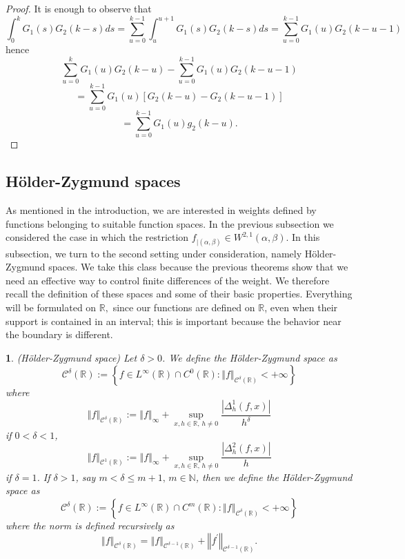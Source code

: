 \documentclass[10pt,a4paper]{amsart}
\numberwithin{equation}{section}
\numberwithin{figure}{section}
\newtheorem{defn}[thm]{\protect\definitionname}
\providecommand{\definitionname}{Definition}
\begin{document}
\begin{proof}
It is enough to observe that
\[
\int_{0}^{k}G_{1}(s)G_{2}(k-s)ds=\sum_{u=0}^{k-1}\int_{u}^{u+1}G_{1}(s)G_{2}(k-s)ds=\sum_{u=0}^{k-1}G_{1}(u)G_{2}(k-u-1)
\]
hence
\[
\sum_{u=0}^{k}G_{1}(u)G_{2}(k-u)-\sum_{u=0}^{k-1}G_{1}(u)G_{2}(k-u-1)
\]
\[
=\sum_{u=0}^{k-1}G_{1}(u)\left[G_{2}(k-u)-G_{2}(k-u-1)\right]
\]
\[
=\sum_{u=0}^{k-1}G_{1}(u)g_{2}\left(k-u\right).
\]
\end{proof}

\subsection{H\"older-Zygmund spaces}

As mentioned in the introduction, we are interested in weights defined
by functions belonging to suitable function spaces. In the previous
subsection we considered the case in which the restriction $f_{\vert\left(\alpha,\beta\right)}\in W^{2,1}\left(\alpha,\beta\right)$.
In this subsection, we turn to the second setting under consideration,
namely H\"older-Zygmund spaces. We take this class because the previous
theorems show that we need an effective way to control finite differences
of the weight. We therefore recall the definition of these spaces
and some of their basic properties. Everything will be formulated
on $\mathbb{R},$ since our functions are defined on $\mathbb{R}$,
even when their support is contained in an interval; this is important
because the behavior near the boundary is different.

\begin{defn}
(H\"older-Zygmund space) Let $\delta>0$. We define the H\"older-Zygmund
space as
\[
\mathcal{C}^{\delta}\left(\mathbb{R}\right):=\left\{ f\in L^{\infty}\left(\mathbb{R}\right)\cap C^{0}\left(\mathbb{R}\right):\left\Vert f\right\Vert _{\mathcal{C}^{\delta}\left(\mathbb{R}\right)}<+\infty\right\} 
\]
where
\[
\left\Vert f\right\Vert _{\mathcal{C}^{\delta}\left(\mathbb{R}\right)}:=\left\Vert f\right\Vert _{\infty}+\sup_{x,h\in\mathbb{R},\,h\neq0}\frac{\left|\Delta_{h}^{1}\left(f,x\right)\right|}{h^{\delta}}
\]
if $0<\delta<1$,
\[
\left\Vert f\right\Vert _{\mathcal{C}^{1}\left(\mathbb{R}\right)}:=\left\Vert f\right\Vert _{\infty}+\sup_{x,h\in\mathbb{R},\,h\neq0}\frac{\left|\Delta_{h}^{2}\left(f,x\right)\right|}{h}
\]
if $\delta=1$. If $\delta>1$, say $m<\delta\leq m+1,\,m\in\mathbb{N}$,
then we define the H\"older-Zygmund space as
\[
\mathcal{C}^{\delta}\left(\mathbb{R}\right):=\left\{ f\in L^{\infty}\left(\mathbb{R}\right)\cap C^{m}\left(\mathbb{R}\right):\left\Vert f\right\Vert _{\mathcal{C}^{\delta}\left(\mathbb{R}\right)}<+\infty\right\} 
\]
where the norm is defined recursively as
\[
\left\Vert f\right\Vert _{\mathcal{C}^{\delta}\left(\mathbb{R}\right)}=\left\Vert f\right\Vert _{\mathcal{C}^{\delta-1}\left(\mathbb{R}\right)}+\left\Vert f^{\prime}\right\Vert _{\mathcal{C}^{\delta-1}\left(\mathbb{R}\right)}.
\]
\end{defn}
\end{document}

